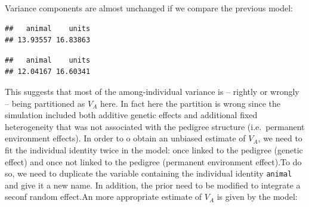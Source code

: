 \documentclass[
  12pt,
]{book}
\newenvironment{Shaded}{\begin{snugshade}}{\end{snugshade}}
\newcommand{\FloatTok}[1]{\textcolor[rgb]{0.00,0.00,0.81}{#1}}
\newcommand{\KeywordTok}[1]{\textcolor[rgb]{0.13,0.29,0.53}{\textbf{#1}}}
\newcommand{\NormalTok}[1]{#1}
\newcommand{\OperatorTok}[1]{\textcolor[rgb]{0.81,0.36,0.00}{\textbf{#1}}}
\begin{document}
Variance components are almost unchanged if we compare the previous model:

\begin{Shaded}
\end{Shaded}

\begin{verbatim}
##   animal    units 
## 13.93557 16.83863
\end{verbatim}

\begin{Shaded}
\end{Shaded}

\begin{verbatim}
##   animal    units 
## 12.04167 16.60341
\end{verbatim}

This suggests that most of the among-individual variance is -- rightly or wrongly -- being partitioned as \(V_A\) here. In fact here the partition is wrong since the simulation included both additive genetic effects and additional fixed heterogeneity that was not associated with the pedigree structure (i.e.~permanent environment effects).
In order to o obtain an unbiased estimate of \(V_A\), we need to fit the individual identity twice in the model: once linked to the pedigree (genetic effect) and once not linked to the pedigree (permanent environment effect).To do so, we need to duplicate the variable containing the individual identity \texttt{animal} and give it a new name. In addition, the prior need to be modified to integrate a seconf random effect.An more appropriate estimate of \(V_A\) is given by the model:
\end{document}
